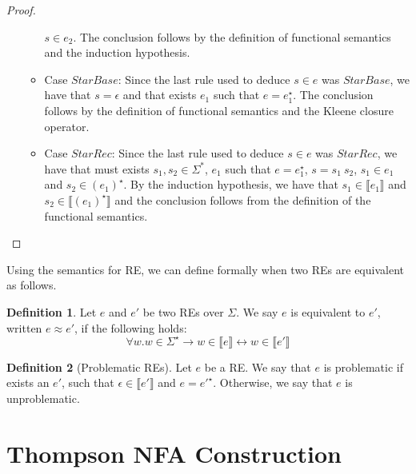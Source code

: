 \documentclass[oneside,12pt]{scrbook}
\theoremstyle{definition}
\newcommand{\sembrackets}[1]{\ensuremath{\llbracket #1 \rrbracket}}
\theoremstyle{plain}
\theoremstyle{definition}
\newtheorem{Definition}{Definition}
\begin{document}
\begin{proof}
\begin{itemize}
\begin{itemize}
			$s \in e_2$. The conclusion follows by the definition of functional semantics and the induction hypothesis.
			\item Case $StarBase$: Since the last rule used to deduce $s \in e$ was $StarBase$, we have that $s = \epsilon$ and that exists $e_1$ such that
			$e = e_1^\star$. The conclusion follows by the definition of functional semantics and the Kleene closure operator.
			\item Case $StarRec$: Since the last rule used to deduce $s \in e$ was $StarRec$, we have that must exists $s_1,s_2 \in \Sigma^*$, $e_1$ such
			that $e = e_1^\star$, $s = s_1\:s_2$, $s_1 \in e_1$ and $s_2 \in (e_1)^\star$. By the induction hypothesis, we have that
			$s_1 \in\sembrackets{e_1}$ and $s_2\in\sembrackets{(e_1)^\star}$ and the conclusion follows from the definition of the functional semantics.
		\end{itemize}
	\end{itemize}
\end{proof}


Using the semantics for RE, we can define formally when two REs are equivalent as follows.

\begin{Definition}
	Let $e$ and $e'$ be two REs over $\Sigma$. We say $e$ is equivalent to $e'$, written $e \approx e'$, if the following holds:
	\[
	\forall w. w \in \Sigma^\star \to w \in \sembrackets{e} \leftrightarrow w \in \sembrackets{e'} 
	\]
\end{Definition}

\begin{Definition}[Problematic REs]
	Let $e$ be a RE. We say that $e$ is problematic if exists an $e'$, such that $\epsilon\in\sembrackets{e'}$ and $e = e'^\star$. Otherwise, we say that $e$ is unproblematic.
\end{Definition}

\section{Thompson NFA Construction}
\label{section:thompsonconstruction}
\end{document}
